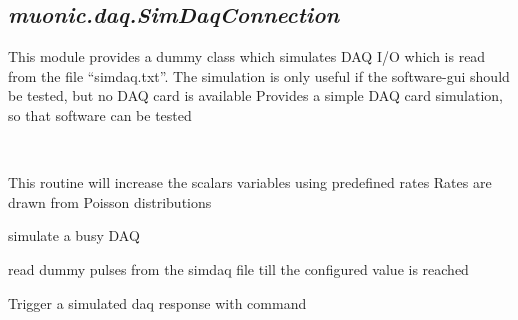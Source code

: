 \documentclass[letterpaper,10pt,english]{sphinxmanual}
\begin{document}
\subsection{\emph{muonic.daq.SimDaqConnection}}
\label{muonic:muonic-daq-simdaqconnection}
This module provides a dummy class which simulates DAQ I/O which is read from the file ``simdaq.txt''.
The simulation is only useful if the software-gui should be tested, but no DAQ card is available
\label{muonic:module-muonic.daq.SimDaqConnection}
Provides a simple DAQ card simulation, so that software can be tested

\begin{fulllineitems}
\label{muonic:muonic.daq.SimDaqConnection.SimDaq}~

\begin{fulllineitems}
\label{muonic:muonic.daq.SimDaqConnection.SimDaq._physics}
This routine will increase the scalars variables using predefined rates
Rates are drawn from Poisson distributions

\end{fulllineitems}


\begin{fulllineitems}
\label{muonic:muonic.daq.SimDaqConnection.SimDaq.inWaiting}
simulate a busy DAQ

\end{fulllineitems}


\begin{fulllineitems}
\label{muonic:muonic.daq.SimDaqConnection.SimDaq.readline}
read dummy pulses from the simdaq file till
the configured value is reached

\end{fulllineitems}


\begin{fulllineitems}
\label{muonic:muonic.daq.SimDaqConnection.SimDaq.write}
Trigger a simulated daq response with command

\end{fulllineitems}


\end{fulllineitems}
\end{document}
